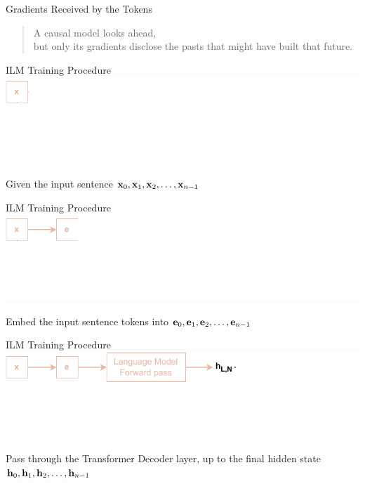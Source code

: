 \begin{frame}{Gradients Received by the Tokens}
    \begin{quote}
        \centering
        A causal model looks ahead, \\ but only its gradients disclose the pasts that might have built that future.
    \end{quote}
\end{frame}

\begin{frame}{ILM Training Procedure}
    \includegraphics[width=\linewidth]{assets/grad_lm_head_parallelism_0.drawio.pdf}
    \vspace{1.5cm}
    
    \centering
    Given the input sentence $\mathbf{x}_0, \mathbf{x}_1, \mathbf{x}_2, \dots, \mathbf{x}_{n-1}$
\end{frame}

\begin{frame}[noframenumbering]{ILM Training Procedure}
    \includegraphics[width=\linewidth]{assets/grad_lm_head_parallelism_1.drawio.pdf}
    \vspace{1.5cm}
    
    \centering
    Embed the input sentence tokens into $\mathbf{e}_0, \mathbf{e}_1, \mathbf{e}_2, \dots, \mathbf{e}_{n-1}$
\end{frame}

\begin{frame}[noframenumbering]{ILM Training Procedure}
    \includegraphics[width=\linewidth]{assets/grad_lm_head_parallelism_2.drawio.pdf}
    \vspace{1.5cm}
    
    \centering
    Pass through the Transformer Decoder layer, up to the final hidden state $\mathbf{h}_0, \mathbf{h}_1, \mathbf{h}_2, \dots, \mathbf{h}_{n-1}$
\end{frame}


